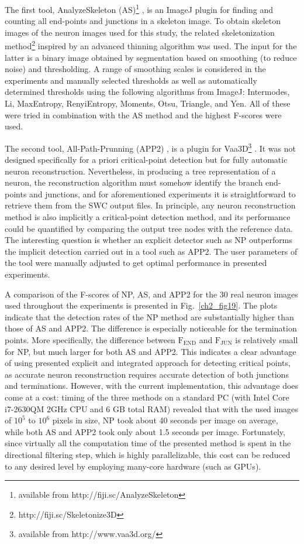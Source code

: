 The first tool, AnalyzeSkeleton (AS)\footnote{available from http://fiji.sc/AnalyzeSkeleton} \cite{arganda20103d}, is an ImageJ plugin for finding and counting all end-points and junctions in a skeleton image. To obtain skeleton images of the neuron images used for this study, the related skeletonization method\footnote{http://fiji.sc/Skeletonize3D} inspired by an advanced thinning algorithm \cite{lee1994building} was used. The input for the latter is a binary image obtained by segmentation based on smoothing (to reduce noise) and thresholding. A range of smoothing scales is considered in the experiments and manually selected thresholds as well as automatically determined thresholds using the following algorithms from ImageJ: Intermodes, Li, MaxEntropy, RenyiEntropy, Moments, Otsu, Triangle, and Yen. All of these were tried in combination with the AS method and the highest F-scores were used.

The second tool, All-Path-Prunning (APP2) \cite{xiao2013app2}, is a plugin for Vaa3D\footnote{available from http://www.vaa3d.org/} \cite{peng2010v3d, peng2014extensible}. It was not designed specifically for a priori critical-point detection but for fully automatic neuron reconstruction. Nevertheless, in producing a tree representation of a neuron, the reconstruction algorithm must somehow identify the branch end-points and junctions, and for aforementioned experiments it is straightforward to retrieve them from the SWC output files. In principle, any neuron reconstruction method is also implicitly a critical-point detection method, and its performance could be quantified by comparing the output tree nodes with the reference data. The interesting question is whether an explicit detector such as NP outperforms the implicit detection carried out in a tool such as APP2. The user parameters of the tool were manually adjusted to get optimal performance in presented experiments.

A comparison of the F-scores of NP, AS, and APP2 for the 30 real neuron images used throughout the experiments is presented in Fig.~\ref{ch2_fig19}. The plots indicate that the detection rates of the NP method are substantially higher than those of AS and APP2. The difference is especially noticeable for the termination points. More specifically, the difference between $\textrm{F}_{\textrm{END}}$ and $\textrm{F}_{\textrm{JUN}}$ is relatively small for NP, but much larger for both AS and APP2. This indicates a clear advantage of using presented explicit and integrated approach for detecting critical points, as accurate neuron reconstruction requires accurate detection of both junctions and terminations. However, with the current implementation, this advantage does come at a cost: timing of the three methods on a standard PC (with Intel Core i7-2630QM 2GHz CPU and 6 GB total RAM) revealed that with the used images of $10^5$ to $10^6$ pixels in size, NP took about 40 seconds per image on average, while both AS and APP2 took only about 1.5 seconds per image. Fortunately, since virtually all the computation time of the presented method is spent in the directional filtering step, which is highly parallelizable, this cost can be reduced to any desired level by employing many-core hardware (such as GPUs).
